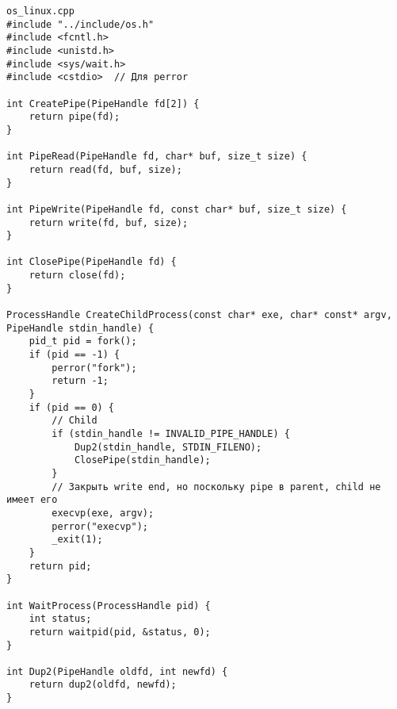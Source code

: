 \begin{verbatim}
os_linux.cpp
#include "../include/os.h"
#include <fcntl.h>
#include <unistd.h>
#include <sys/wait.h>
#include <cstdio>  // Для perror

int CreatePipe(PipeHandle fd[2]) {
    return pipe(fd);
}

int PipeRead(PipeHandle fd, char* buf, size_t size) {
    return read(fd, buf, size);
}

int PipeWrite(PipeHandle fd, const char* buf, size_t size) {
    return write(fd, buf, size);
}

int ClosePipe(PipeHandle fd) {
    return close(fd);
}

ProcessHandle CreateChildProcess(const char* exe, char* const* argv, PipeHandle stdin_handle) {
    pid_t pid = fork();
    if (pid == -1) {
        perror("fork");
        return -1;
    }
    if (pid == 0) {
        // Child
        if (stdin_handle != INVALID_PIPE_HANDLE) {
            Dup2(stdin_handle, STDIN_FILENO);
            ClosePipe(stdin_handle);
        }
        // Закрыть write end, но поскольку pipe в parent, child не имеет его
        execvp(exe, argv);
        perror("execvp");
        _exit(1);
    }
    return pid;
}

int WaitProcess(ProcessHandle pid) {
    int status;
    return waitpid(pid, &status, 0);
}

int Dup2(PipeHandle oldfd, int newfd) {
    return dup2(oldfd, newfd);
}
\end{verbatim}


